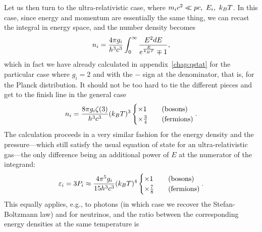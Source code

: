 Let us then turn to the ultra-relativistic case, where $m_i c^2 \ll pc,~E_i,~k_B T$.
In this case, since energy and momentum are essentially the same thing, we can
recast the integral in energy space, and the number density becomes
\begin{align*}
  n_i = \frac{4\pi g_i}{h^3 c^3} \int_0^\infty \frac{E^2 dE}{e^\frac{E}{k_B T} \mp 1},
\end{align*}
which in fact we have already calculated in appendix~\ref{chap:qstat} for the
particular case where $g_i = 2$ and with the $-$ sign at the denominator, that is,
for the Planck distribution. It should not be too hard to tie the different pieces
and get to the finish line in the general case
\begin{align}\label{eq:ur_number_density}
  n_i = \frac{8 \pi g_i \zeta(3)}{h^3 c^3} (k_B T)^3
  \begin{cases}
    \times 1 \quad & \text{(bosons)}\\
    \times \frac{3}{4} \quad & \text{(fermions)}
  \end{cases}.
\end{align}
The calculation proceeds in a very similar fashion for the energy density and the
pressure---which still satisfy the usual equation of state for an ultra-relativistic
gas---the only difference being an additional power of $E$ at the numerator of
the integrand:
\begin{align}
  \varepsilon_i = 3 P_i \approx \frac{4 \pi^5 g_i}{15 h^3 c^3} (k_B T)^4
  \begin{cases}
    \times 1 \quad & \text{(bosons)}\\
    \times \frac{7}{8} \quad & \text{(fermions)}
  \end{cases}.
\end{align}
This equally applies, e.g., to photons (in which case we recover the Stefan-Boltzmann
law) and for neutrinos, and the ratio between the corresponding energy densities
at the same temperature is
